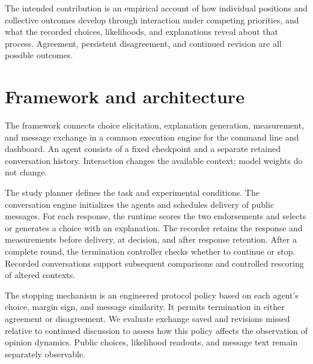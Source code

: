 \documentclass[11pt,a4paper]{article}
\begin{document}
The intended contribution is an empirical account of how individual positions and collective outcomes develop through interaction under competing priorities, and what the recorded choices, likelihoods, and explanations reveal about that process. Agreement, persistent disagreement, and continued revision are all possible outcomes.

\section{Framework and architecture}
The framework connects choice elicitation, explanation generation, measurement, and message exchange in a common execution engine for the command line and dashboard. An agent consists of a fixed checkpoint and a separate retained conversation history. Interaction changes the available context; model weights do not change.

The study planner defines the task and experimental conditions. The conversation engine initializes the agents and schedules delivery of public messages. For each response, the runtime scores the two endorsements and selects or generates a choice with an explanation. The recorder retains the response and measurements before delivery, at decision, and after response retention. After a complete round, the termination controller checks whether to continue or stop. Recorded conversations support subsequent comparisons and controlled rescoring of altered contexts.

The stopping mechanism is an engineered protocol policy based on each agent's choice, margin sign, and message similarity. It permits termination in either agreement or disagreement. We evaluate exchange saved and revisions missed relative to continued discussion to assess how this policy affects the observation of opinion dynamics. Public choices, likelihood readouts, and message text remain separately observable.
\end{document}
